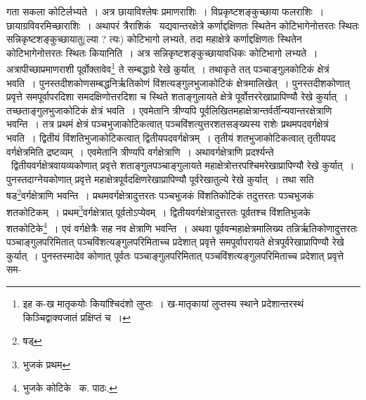 \documentclass[11pt, openany]{book}
\begin{document}
\noindent गता सकला कोटिर्लभ्यते~। अत्र छायाविश्लेषः प्रमाणराशिः~। विप्रकृष्टशङ्कुच्छाया फलराशिः~। छायाग्रविवरमिच्छाराशिः~। अथापरं
त्रैराशिकं \textendash\ यद्यवान्तरक्षेत्रे कर्णाद्दक्षिणतः स्थितेन कोटिभागेनोत्तरतः स्थितः सन्निकृष्टशङ्कुच्छायातु(ल्या ? त्यः) कोटिभागो लभ्यते, तदा महाक्षेत्रे कर्णाद्दक्षिणतः स्थितेन कोटिभागेनोत्तरतः स्थितः कियानिति~। अत्र सन्निकृष्टशङ्कुच्छायावधिकः कोटिभागो लभ्यते~। अत्रापीच्छाप्रमाणराशी पूर्वोक्तावेव\renewcommand{\thefootnote}{*}\footnote{इह क-ख मातृकयोः कियांश्चिदंशो लुप्तः~। ख-मातृकायां लुप्तस्य स्थाने प्रदेशान्तरस्थं किञ्चिद्वाक्यजातं प्रक्षिप्तं च~।} ते सम्बद्धाग्रे रेखे कुर्यात्~। तथाकृते तत् पञ्चाङ्गुलकोटिकं क्षेत्रं भवति~। पुनस्तदीशकोणसम्बद्धनिर्ऋतिकोणं विंशत्यङ्गुलभुजाकोटिकं क्षेत्रमालिखेत्~। पुनस्तदीशकोणात् प्रवृत्ते समपूर्वापरदिशा समदक्षिणोत्तरदिशा च स्थिते शताङ्गुलायते क्षेत्रे पूर्वोत्तररेखाप्रापिण्यौ रेखे कुर्यात्~। तच्छताङ्गुलभुजाकोटिकं क्षेत्रं भवति~। एवमेतानि त्रीण्यपि पूर्वलिखितमहाक्षेत्रान्तर्वर्तीन्यवान्तरक्षेत्राणि भवन्ति~। तत्र प्रथमं क्षेत्रं पञ्चभुजाकोटिकत्वात् पञ्चविंशत्युत्तरशतसङ्ख्यस्य राशेः प्रथमपदवर्गक्षेत्रं भवति~। द्वितीयं विंशतिभुजाकोटिकत्वात् द्वितीयपदवर्गक्षेत्रम्~। तृतीयं शतभुजाकोटिकत्वात् तृतीयपद वर्गक्षेत्रमिति द्रष्टव्यम्~। एवमेतानि त्रीण्यपि वर्गक्षेत्राणि~। अथावर्गक्षेत्राणि प्रदर्श्यन्ते \textendash\ द्वितीयवर्गक्षेत्रवायव्यकोणात् प्रवृत्ते शताङ्गुलपञ्चाङ्गुलायते महाक्षेत्रोत्तरपश्चिमरेखाप्रापिण्यौ रेखे कुर्यात्~। पुनस्तदाग्नेयकोणात् प्रवृत्ते महाक्षेत्रपूर्वदक्षिणरेखाप्रापिण्यौ पूर्वरेखातुल्ये रेखे कुर्यात्~। तथा सति षड\renewcommand{\thefootnote}{१}\footnote{षड्}वर्गक्षेत्राणि भवन्ति~। प्रथमवर्गक्षेत्रादुत्तरतः पञ्चभुजकं
विंशतिकोटिकं तदुत्तरतः पञ्चभुजकं शतकोटिकम्~। प्रथम\renewcommand{\thefootnote}{२}\footnote{भुजकं प्रथम}वर्गक्षेत्रात् पूर्वतोऽप्येवम्~। द्वितीयवर्गक्षेत्रादुत्तरतः पूर्वतश्च विंशतिभुजके शतकोटिके\renewcommand{\thefootnote}{३}\footnote{भुजके कोटिके \textendash\ क. पाठः.}~। एवं
वर्गक्षेत्रैः सह नव क्षेत्राणि भवन्ति~। अथवा पूर्ववन्महाक्षेत्रमालिख्य तन्निर्ऋतिकोणादुत्तरतः पञ्चाङ्गुलपरिमितात् पञ्चविंशत्यङ्गुलपरिमिताच्च प्रदेशात्
प्रवृत्ते समपूर्वापरायते क्षेत्रपूर्वरेखाप्रापिण्यौ रेखे कुर्यात्~। पुनस्तस्मादेव कोणात् पूर्वतः पञ्चाङ्गुलपरिमितात् पञ्चविंशत्यङ्गुलपरिमिताच्च प्रदेशात्
प्रवृत्ते सम-

\newpage
\end{document}
